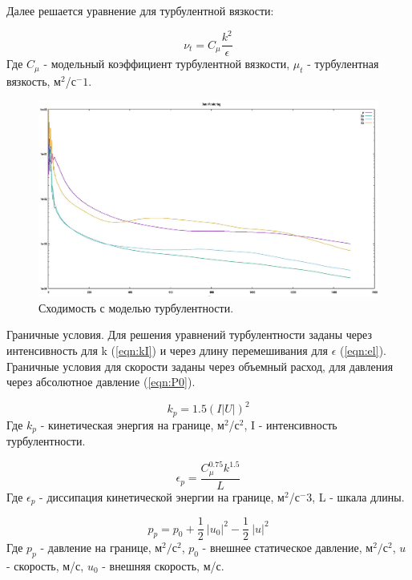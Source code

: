 \documentclass[14pt,a4paper]{article}
\begin{document}
        Далее решается уравнение для турбулентной вязкости:
        
        \begin{equation}\label{eqn:mu}
           \nu_{t} = C_{\mu}\frac{k^2}{\epsilon}
        \end{equation} 
        Где $C_{\mu}$ - модельный коэффициент турбулентной вязкости, $\mu_{t}$ - турбулентная вязкость, м$^2$/с$^-1$.
        
        \begin{figure}[H]
            \centering
            \includegraphics[width = 1\linewidth]{dataMonitoringRAS}
            \caption{Сходимость с моделью турбулентности.}
            \label{fig:DRRAS}
        \end{figure}
        
        Граничные условия. Для решения уравнений турбулентности заданы через интенсивность для k (\ref{eqn:kI}) и через длину перемешивания для $\epsilon$ (\ref{eqn:el}). Граничные условия для скорости заданы через объемный расход, для давления через абсолютное давление (\ref{eqn:P0}).
        
        \begin{equation}\label{eqn:kI}
            k_{p} = 1.5 (I |U|)^2
        \end{equation}
        Где $k_{p}$ - кинетическая энергия на границе, м$^2$/с$^2$, I - интенсивность турбулентности.
        
        \begin{equation}\label{eqn:el}
            \epsilon_{p} = \frac{C_{\mu}^{0.75} k^{1.5}}{L}           
        \end{equation}
        Где $\epsilon_{p}$ - диссипация кинетической энергии на границе, м$^2$/с$^-3$, L - шкала длины.
        
        \begin{equation}\label{eqn:P0}
            p_{p} = p_{0} + \frac{1}{2}\ \left|u_{0}\right|^2 - \frac{1}{2}\ \left|u\right|^2
        \end{equation}
        Где $p_{p}$ - давление на границе, м$^{2}/$с$^{2}$, $p_{0}$ - внешнее статическое давление, м$^{2}/$с$^{2}$, $u$ - скорость, м/с, $u_{0}$ - внешняя скорость, м/с.
        
\end{document}
